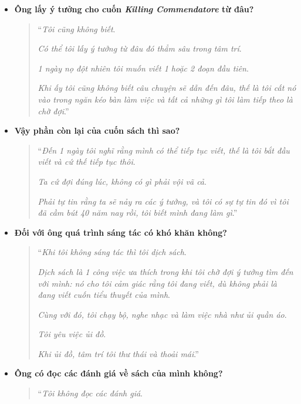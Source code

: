 \documentclass{article}
\begin{document}
\begin{itemize}
	\item \textbf{Ông lấy ý tưởng cho cuốn \textit{Killing Commendatore} từ đâu?}
	
	\begin{quotation}
		``\textit{Tôi cũng không biết}.
		
		\textit{Có thể tôi lấy ý tưởng từ đâu đó thẳm sâu trong tâm trí}.
		
		\textit{1 ngày nọ đột nhiên tôi muốn viết 1 hoặc 2 đoạn đầu tiên}.
		
		\textit{Khi ấy tôi cũng không biết câu chuyện sẽ dẫn đến đâu, thế là tôi cất nó vào trong ngăn kéo bàn làm việc và tất cả những gì tôi làm tiếp theo là chờ đợi}.''
	\end{quotation}
	
	\item \textbf{Vậy phần còn lại của cuốn sách thì sao?}
	
	\begin{quotation}
		``\textit{Đến 1 ngày tôi nghĩ rằng mình có thể tiếp tục viết, thế là tôi bắt đầu viết và cứ thế tiếp tục thôi}.
		
		\textit{Ta cứ đợi đúng lúc, không có gì phải vội vã cả}.
		
		\textit{Phải tự tin rằng ta sẽ nảy ra các ý tưởng, và tôi có sự tự tin đó vì tôi đã cầm bút 40 năm nay rồi, tôi biết mình đang làm gì}.''
	\end{quotation}
	
	\item \textbf{Đối với ông quá trình sáng tác có khó khăn không?}
	\begin{quotation}
		``\textit{Khi tôi không sáng tác thì tôi dịch sách}.
		
		\textit{Dịch sách là 1 công việc ưa thích trong khi tôi chờ đợi ý tưởng tìm đến với mình: nó cho tôi cảm giác rằng tôi đang viết, dù không phải là đang viết cuốn tiểu thuyết của mình}.
		
		\textit{Cùng với đó, tôi chạy bộ, nghe nhạc và làm việc nhà như ủi quần áo}.
		
		\textit{Tôi yêu việc ủi đồ}.
		
		\textit{Khi ủi đồ, tâm trí tôi thư thái và thoải mái}.''
	\end{quotation}
	
	\item \textbf{Ông có đọc các đánh giá về sách của mình không?}
	
	\begin{quotation}
		``\textit{Tôi không đọc các đánh giá}.
		

\end{quotation}
\end{itemize}
\end{document}
